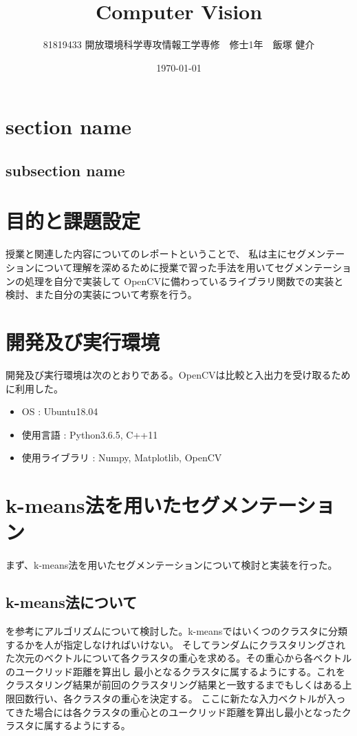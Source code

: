 \documentclass[11pt,a4j]{jsarticle}
\title{Computer Vision}
\author{81819433 開放環境科学専攻情報工学専修　修士1年　飯塚 健介}
\date{\today}
\begin{document}
    \maketitle

    \section{section name}
    \subsection{subsection name}

    \section{目的と課題設定}
    授業と関連した内容についてのレポートということで、
    私は主にセグメンテーションについて理解を深めるために授業で習った手法を用いてセグメンテーションの処理を自分で実装して
    OpenCVに備わっているライブラリ関数での実装と検討、また自分の実装について考察を行う。


    \section{開発及び実行環境}
    開発及び実行環境は次のとおりである。OpenCVは比較と入出力を受け取るために利用した。
    \begin{itemize}
        \item OS : Ubuntu18.04 
        \item 使用言語 : Python3.6.5, C++11 
        \item 使用ライブラリ : Numpy, Matplotlib, OpenCV 
       \end{itemize}

    \section{k-means法を用いたセグメンテーション}
    まず、k-means法を用いたセグメンテーションについて検討と実装を行った。

    \subsection{k-means法について}
    \cite{k-means}を参考にアルゴリズムについて検討した。k-meansではいくつのクラスタに分類するかを人が指定しなければいけない。
    そしてランダムにクラスタリングされた次元のベクトルについて各クラスタの重心を求める。その重心から各ベクトルのユークリッド距離を算出し
    最小となるクラスタに属するようにする。これをクラスタリング結果が前回のクラスタリング結果と一致するまでもしくはある上限回数行い、各クラスタの重心を決定する。
    ここに新たな入力ベクトルが入ってきた場合には各クラスタの重心とのユークリッド距離を算出し最小となったクラスタに属するようにする。
\end{document}
